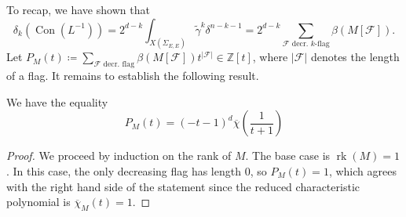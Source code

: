 \documentclass[12pt,a4paper,english]{scrartcl}
\newcommand{\ZZ}{\mathbb{Z}}
\DeclareMathOperator{\rank}{rk}
\DeclareMathOperator{\Con}{Con}
\begin{document}
To recap, we have shown that
\[
\delta_k(\Con(L^{-1})) = 2^{d-k} \int_{X(\Sigma_{E,E})} \tilde{\gamma}^k \delta^{n-k-1} = 2^{d-k}\sum_{\mathcal{F}\text{ decr.\ $k$-flag}} \beta(M[\mathcal{F}]).
\]
Let $P_M(t) \coloneq \sum_{\mathcal{F}\text{ decr. flag}} \beta(M[\mathcal{F}]) t^{|\mathcal{F}|} \in \ZZ[t]$, where $|\mathcal{F}|$ denotes the length of a flag. It remains to establish the following result.
\begin{lemma}\label{lem: polynomialFormula}
We have the equality
\[
P_M(t) = (-t-1)^{d}\overline{\chi}\left(\frac{1}{t+1}\right)
\]
\end{lemma}
\begin{proof}
We proceed by induction on the rank of $M$. The base case is
$\rank(M) = 1$. In this case,
the only decreasing flag has length 0, so $P_M(t) = 1$, which agrees with the right hand side of the statement since the reduced characteristic polynomial is
$
\overline{\chi}_M(t) = 1
$.


\end{proof}
\end{document}
